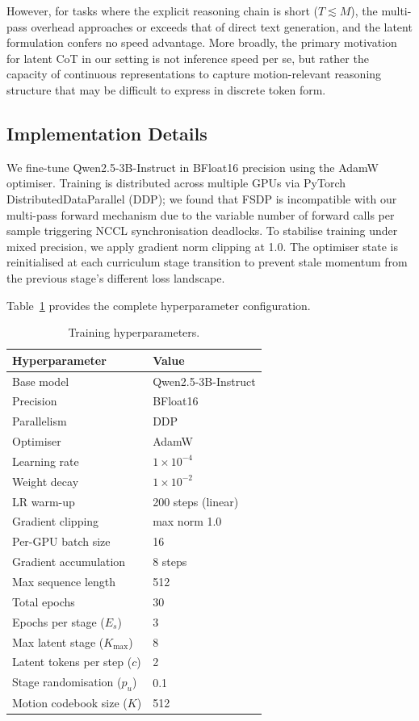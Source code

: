However, for tasks where the explicit reasoning chain is short
($T{\lesssim}M$), the multi-pass overhead approaches or exceeds that of
direct text generation, and the latent formulation confers no speed
advantage.
More broadly, the primary motivation for latent CoT in our setting is
not inference speed per se, but rather the capacity of continuous
representations to capture motion-relevant reasoning structure that may
be difficult to express in discrete token form.

\subsection{Implementation Details}
\label{sec:training_details}

We fine-tune Qwen2.5-3B-Instruct in BFloat16 precision using the AdamW
optimiser.
Training is distributed across multiple GPUs via PyTorch
DistributedDataParallel (DDP); we found that FSDP is incompatible with our
multi-pass forward mechanism due to the variable number of forward calls
per sample triggering NCCL synchronisation deadlocks.
To stabilise training under mixed precision, we apply gradient norm
clipping at 1.0\@.
The optimiser state is reinitialised at each curriculum stage transition to
prevent stale momentum from the previous stage's different loss landscape.

Table~\ref{tab:hyperparams} provides the complete hyperparameter
configuration.

\begin{table}[t]
\centering
\caption{Training hyperparameters.}
\label{tab:hyperparams}
\setlength{\tabcolsep}{10pt}
\begin{tabular}{ll}
\toprule
Hyperparameter & Value \\
\midrule
Base model & Qwen2.5-3B-Instruct \\
Precision & BFloat16 \\
Parallelism & DDP \\
Optimiser & AdamW \\
Learning rate & $1\times10^{-4}$ \\
Weight decay & $1\times10^{-2}$ \\
LR warm-up & 200 steps (linear) \\
Gradient clipping & max norm 1.0 \\
Per-GPU batch size & 16 \\
Gradient accumulation & 8 steps \\
Max sequence length & 512 \\
Total epochs & 30 \\
Epochs per stage ($E_s$) & 3 \\
Max latent stage ($K_{\max}$) & 8 \\
Latent tokens per step ($c$) & 2 \\
Stage randomisation ($p_u$) & 0.1 \\
Motion codebook size ($K$) & 512 \\
\bottomrule
\end{tabular}
\end{table}

